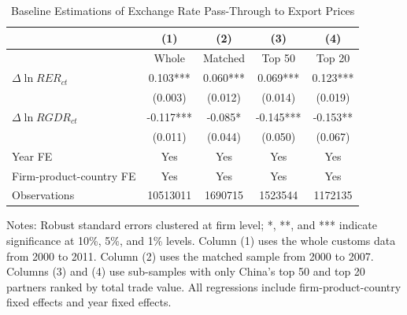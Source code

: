 \begin{table}[H]
	\centering
	\caption{Baseline Estimations of Exchange Rate Pass-Through to Export Prices}
	\begin{threeparttable}
		\begin{tabular}{lcccc}
			\toprule
			& (1)   & (2)   & (3)   & (4) \\
			\midrule
			& Whole & Matched & Top 50 & Top 20 \\
			\midrule
			$\Delta \ln RER_{ct}$ & 0.103*** & 0.060*** & 0.069*** & 0.123*** \\
			& (0.003) & (0.012) & (0.014) & (0.019) \\
			$\Delta \ln RGDR_{ct}$ &  -0.117*** & -0.085* & -0.145*** & -0.153** \\
			& (0.011) & (0.044) & (0.050) & (0.067) \\
			Year FE  & Yes   & Yes   & Yes   & Yes \\
			Firm-product-country FE & Yes   & Yes   & Yes   & Yes \\
			Observations & 10513011 & 1690715 & 1523544 & 1172135 \\
			\bottomrule
		\end{tabular}
		\begin{tablenotes}
			\footnotesize
			\item Notes: Robust standard errors clustered at firm level;  *, **, and *** indicate significance at 10\%, 5\%, and 1\% levels. Column (1) uses the whole customs data from 2000 to 2011. Column (2) uses the matched sample from 2000 to 2007. Columns (3) and (4) use sub-samples with only China's top 50 and top 20 partners ranked by total trade value. All regressions include firm-product-country fixed effects and year fixed effects. 
		\end{tablenotes}
	\end{threeparttable}
	\label{tab.baseline.exp}
\end{table}

